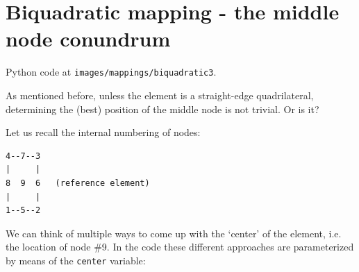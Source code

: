 \newpage

\section{Biquadratic mapping - the middle node conundrum}

Python code at {\tt images/mappings/biquadratic3}.

As mentioned before, unless the element is a straight-edge quadrilateral, 
determining the (best) position of the middle node is not trivial. Or is it?

Let us recall the internal numbering of nodes:
\begin{verbatim}
4--7--3
|     |
8  9  6   (reference element)
|     |
1--5--2
\end{verbatim}


We can think of multiple ways to come up with the `center' of the element, 
i.e. the location of node \#9. %
In the code these different approaches are parameterized by means of the
\lstinline{center} variable:

